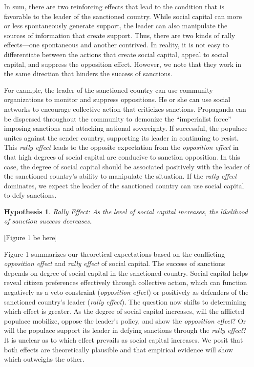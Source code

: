 \documentclass[
  english,
  man]{apa6}
\newtheorem{hyp}{Hypothesis}
\begin{document}
In sum, there are two reinforcing effects that lead to the condition that is favorable to the leader of the sanctioned country. While social capital can more or less spontaneously generate support, the leader can also manipulate the sources of information that create support. Thus, there are two kinds of rally effects---one spontaneous and another contrived. In reality, it is not easy to differentiate between the actions that create social capital, appeal to social capital, and suppress the opposition effect. However, we note that they work in the same direction that hinders the success of sanctions.

For example, the leader of the sanctioned country can use community organizations to monitor and suppress oppositions. He or she can use social networks to encourage collective action that criticizes sanctions. Propaganda can be dispersed throughout the community to demonize the ``imperialist force'' imposing sanctions and attacking national sovereignty. If successful, the populace unites against the sender country, supporting its leader in continuing to resist. This \emph{rally effect} leads to the opposite expectation from the \emph{opposition effect} in that high degrees of social capital are conducive to sanction opposition. In this case, the degree of social capital should be associated positively with the leader of the sanctioned country's ability to manipulate the situation. If the \emph{rally effect} dominates, we expect the leader of the sanctioned country can use social capital to defy sanctions.
\newline

\begin{hyp}\label{rally} Rally Effect: As the level of social capital increases, the likelihood of sanction success decreases.\end{hyp}

\begin{center}
[Figure 1 be here]
\end{center}

Figure 1 summarizes our theoretical expectations based on the conflicting \emph{opposition effect} and \emph{rally effect} of social capital. The success of sanctions depends on degree of social capital in the sanctioned country. Social capital helps reveal citizen preferences effectively through collective action, which can function negatively as a veto constraint (\emph{opposition effect}) or positively as defenders of the sanctioned country's leader (\emph{rally effect}).
The question now shifts to determining which effect is greater. As the degree of social capital increases, will the afflicted populace mobilize, oppose the leader's policy, and show the \emph{opposition effect}? Or will the populace support its leader in defying sanctions through the \emph{rally effect}? It is unclear as to which effect prevails as social capital increases. We posit that both effects are theoretically plausible and that empirical evidence will show which outweighs the other.
\end{document}
